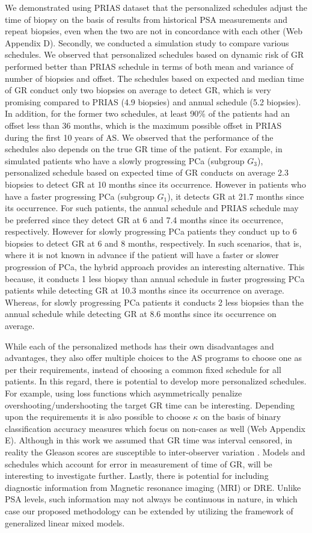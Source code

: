 We demonstrated using PRIAS dataset that the personalized schedules adjust the time of biopsy on the basis of results from historical PSA measurements and repeat biopsies, even when the two are not in concordance with each other (Web Appendix D). Secondly, we conducted a simulation study to compare various schedules. We observed that personalized schedules based on dynamic risk of GR performed better than PRIAS schedule in terms of both mean and variance of number of biopsies and offset. The schedules based on expected and median time of GR conduct only two biopsies on average to detect GR, which is very promising compared to PRIAS (4.9 biopsies) and annual schedule (5.2 biopsies). In addition, for the former two schedules, at least 90\% of the patients had an offset less than 36 months, which is the maximum possible offset in PRIAS during the first 10 years of AS. We observed that the performance of the schedules also depends on the true GR time of the patient. For example, in simulated patients who have a slowly progressing PCa (subgroup $G_3$), personalized schedule based on expected time of GR conducts on average 2.3 biopsies to detect GR at 10 months since its occurrence. However in patients who have a faster progressing PCa (subgroup $G_1$), it detects GR at 21.7 months since its occurrence. For such patients, the annual schedule and PRIAS schedule may be preferred since they detect GR at 6 and 7.4 months since its occurrence, respectively. However for slowly progressing PCa patients they conduct up to 6 biopsies to detect GR at 6 and 8 months, respectively. In such scenarios, that is, where it is not known in advance if the patient will have a faster or slower progression of PCa, the hybrid approach provides an interesting alternative. This because, it conducts 1 less biopsy than annual schedule in faster progressing PCa patients while detecting GR at 10.3 months since its occurrence on average. Whereas, for slowly progressing PCa patients it conducts 2 less biopsies than the annual schedule while detecting GR at 8.6 months since its occurrence on average.

While each of the personalized methods has their own disadvantages and advantages, they also offer multiple choices to the AS programs to choose one as per their requirements, instead of choosing a common fixed schedule for all patients. In this regard, there is potential to develop more personalized schedules. For example, using loss functions which asymmetrically penalize overshooting/undershooting the target GR time can be interesting. Depending upon the requirements it is also possible to choose $\kappa$ on the basis of binary classification accuracy measures which focus on non-cases as well (Web Appendix E). Although in this work we assumed that GR time was interval censored, in reality the Gleason scores are susceptible to inter-observer variation \citep{Gleason_interobs_var}. Models and schedules which account for error in measurement of time of GR, will be interesting to investigate further. Lastly, there is potential for including diagnostic information from Magnetic resonance imaging (MRI) or DRE. Unlike PSA levels, such information may not always be continuous in nature, in which case our proposed methodology can be extended by utilizing the framework of generalized linear mixed models.
